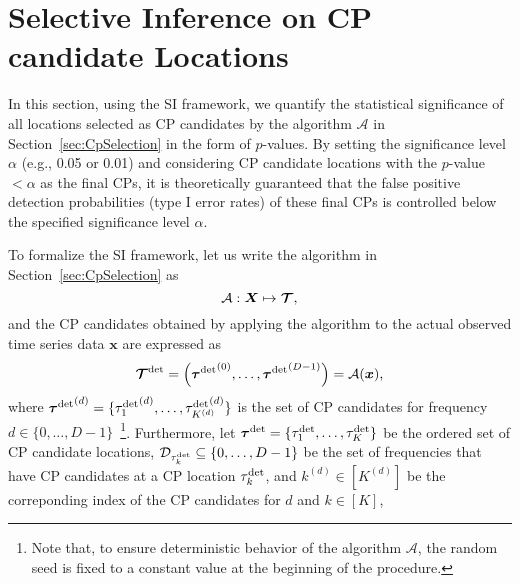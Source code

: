 \section{Selective Inference on CP candidate Locations}
\label{sec:SI}
%
In this section, using the SI framework, we quantify the statistical significance of all locations selected as CP candidates by the algorithm $\mathcal{A}$ in Section~\ref{sec:CpSelection} in the form of $p$-values.
%
By setting the significance level $\alpha$ (e.g., 0.05 or 0.01) and considering CP candidate locations with the $p$-value $< \alpha$ as the final CPs, 
it is theoretically guaranteed that the false positive detection probabilities (type I error rates) of these final CPs is controlled below the specified significance level $\alpha$.

To formalize the SI framework, let us write the algorithm in Section~\ref{sec:CpSelection} as  
\begin{equation}
\mathcal{A}: \bm{X} \mapsto \bm{\mathcal{T}}, \notag
\end{equation}
and the CP candidates obtained by applying the algorithm to the actual observed time series data \(\bm{x}\) are expressed as  
\begin{equation}
\bm{\mathcal{T}}^{\rm det} = \left({\bm{\tau}^{\rm det}}^{(0)}, \ldots, {\bm{\tau}^{\rm det}}^{(D-1)} \right) = \mathcal{A}(\bm{x}), \label{eq:detected_obs}
\end{equation}
where ${\bm{\tau}^{\rm det}}^{(d)} = \{{\tau_1^{\rm det}}^{(d)}, \ldots, {\tau_{K^{(d)}}^{\rm det}}^{\hspace{-1.6mm}(d)}\}$ 
is the set of CP candidates for frequency $d \in \{0, \ldots, D-1\}$~\footnote{
Note that, to ensure deterministic behavior of the algorithm $\mathcal{A}$, 
the random seed is fixed to a constant value at the beginning of the procedure.}.
%
Furthermore,
let
$\bm{\tau}^{\rm det} = \{\tau_1^{\rm det}, \ldots, \tau_K^{\rm det}\}$
be the ordered set of CP candidate locations, 
$\mathcal{D}_{\tau_k^{\rm det}} \subseteq \{0, \dots, D - 1\}$
be the set of frequencies that have CP candidates at a CP location $\tau_k^{\rm det}$,
and
$k^{(d)} \in [K^{(d)}]$
be the correponding index of the CP candidates for
$d$
and 
$k \in [K]$,
